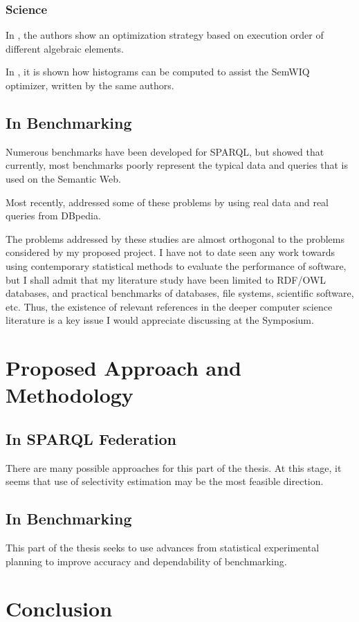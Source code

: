 \documentclass{llncs}
\begin{document}
\subsubsection{Science}

In \cite{springerlink:10.1007/978-3-642-21064-8_1}, the authors show
an optimization strategy based on execution order of different
algebraic elements. %

In \cite{5337556}, it is shown how histograms can be computed to
assist the SemWIQ optimizer, written by the same authors.

\subsection{In Benchmarking}

Numerous benchmarks have been developed for SPARQL, but
\cite{Duan:2011:AOC:1989323.1989340} showed that currently, most
benchmarks poorly represent the typical data and queries that is used
on the Semantic Web.

Most recently, \cite{mxro:Morsey2011DBpedia} addressed some of these
problems by using real data and real queries from DBpedia.

The problems addressed by these studies are almost orthogonal to the
problems considered by my proposed project. I have not to date seen
any work towards using contemporary statistical methods to evaluate
the performance of software, but I shall admit that my literature
study have been limited to RDF/OWL databases, and practical benchmarks
of databases, file systems, scientific software, etc. Thus, the
existence of relevant references in the deeper computer science
literature is a key issue I would appreciate discussing at the
Symposium.


\section{Proposed Approach and Methodology}

\subsection{In SPARQL Federation}

There are many possible approaches for this part of the thesis. At
this stage, it seems that use of selectivity estimation may be the
most feasible direction.

\subsection{In Benchmarking}

This part of the thesis seeks to use advances from statistical
experimental planning to improve accuracy and dependability of benchmarking.

\section{Conclusion}
\end{document}
